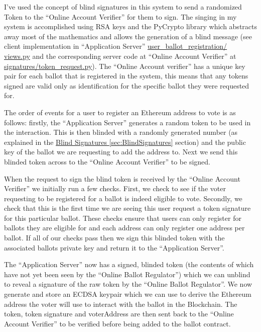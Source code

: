 \documentclass{article}
\begin{document}
I've used the concept of blind signatures in this system to send a randomized Token to the ``Online Account Verifier'' for them to sign. The singing in my system is accomplished using RSA keys and the PyCrypto library \citep{66_pycrypto_the_python_cryptography_toolkit_2017} which abstracts away most of the mathematics and allows the generation of a blind message (see client implementation in ``Application Server'' \href{https://github.com/Mattie432/Blockchain-Voting-System/blob/master/Programming/2_ApplicationServer/user_ballot_registration/views.py#L135}{user\_ballot\_registration/\\views.py} and the corresponding server code at ``Online Account Verifier'' at \href{https://github.com/Mattie432/Blockchain-Voting-System/blob/master/Programming/3_OnlineAccountVerifier/signatures/token_request.py}{signatures/token\_request.py}). The ``Online Account verifier'' has a unique key pair for each ballot that is registered in the system, this means that any tokens signed are valid only as identification for the specific ballot they were requested for.

The order of events for a user to register an Ethereum address to vote is as follows: firstly, the ``Application Server'' generates a random token to be used in the interaction. This is then blinded with a randomly generated number (as explained in the \hyperref[sec:BlindSignatures]{Blind Signatures \ref*{sec:BlindSignatures}} section) and the public key of the ballot we are requesting to add the address to. Next we send this blinded token across to the ``Online Account Verifier'' to be signed.

When the request to sign the blind token is received by the ``Online Account Verifier'' we initially run a few checks. First, we check to see if the voter requesting to be registered for a ballot is indeed eligible to vote. Secondly, we check that this is the first time we are seeing this user request a token signature for this particular ballot. These checks ensure that users can only register for ballots they are eligible for and each address can only register one address per ballot. If all of our checks pass then we sign this blinded token with the associated ballots private key and return it to the ``Application Server''.

The ``Application Server'' now has a signed, blinded token (the contents of which have not yet been seen by the ``Online Ballot Regulator'') which we can unblind to reveal a signature of the raw token by the ``Online Ballot Regulator''. We now generate and store an ECDSA keypair \citep{67_kobel_2017} which we can use to derive the Ethereum address the voter will use to interact with the ballot in the Blockchain. The token, token signature and voterAddress are then sent back to the ``Online Account Verifier'' to be verified before being added to the ballot contract.
\end{document}
